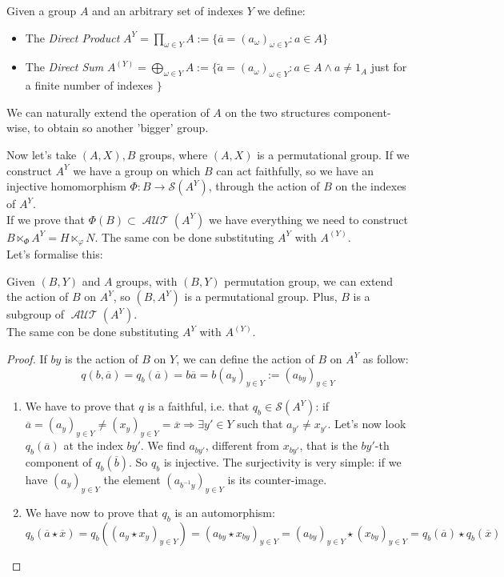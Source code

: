 \documentclass[mat1]{fmfdeloTS}
\DeclareMathOperator{\aut}{\mathcal{AUT}}
\begin{document}
\begin{definition}
Given a group $A$ and an arbitrary set of indexes $Y$ we define:
\begin{itemize}
\item 
\begin{description}
The \textit{Direct Product}
$A^Y = \prod_{\omega\in Y} A:=\{ \overline{a}=(a_\omega )_{\omega\in Y} : a\in A\}$
\end{description}
\item 
\begin{description}
The \textit{Direct Sum} 
$A^{(Y)} = \bigoplus_{\omega\in Y} A:=\{ \widetilde{a}=(a_\omega )_{\omega\in Y} : a\in A \wedge a\neq 1_A$ just for a finite number of indexes $\}$
\end{description}
\end{itemize}
We can naturally extend the operation of $A$ on the two structures component-wise, to obtain so another 'bigger' group.
\end{definition}


Now let's take $(A,X),B$ groups, where $(A,X)$ is a permutational group. If we construct $A^{Y}$ we have a group on which $B$ can act faithfully, so we have an injective homomorphism $\Phi : B\longrightarrow \mathcal{S}(A^Y)$, through the action of $B$ on the indexes of $A^Y$. \\
If we prove that $\Phi(B)\subset\aut(A^Y)$ we have everything we need to construct $B\ltimes_{\Phi} A^{Y}=H\ltimes_{\varphi} N$. The same con be done substituting $A^{Y}$ with $A^{(Y)}$.
\\
Let's formalise this:

\begin{proposition}
Given $(B,Y)$ and $A$ groups, with $(B,Y)$ permutation group, we can extend the action of $B$ on $A^Y$, so $(B,A^Y)$ is a permutational group. Plus, $B$ is a subgroup of $\aut(A^Y)$.\\
The same con be done substituting $A^{Y}$ with $A^{(Y)}$.
\end{proposition}
\begin{proof}
If $by$ is the action of $B$ on $Y$, we can define the action of $B$ on $A^Y$ as follow:
$$q(b,\overline{a})=q_b(\overline{a})=b\overline{a}=b(a_y)_{y\in Y}:=(a_{by})_{y\in Y}$$
\begin{enumerate}
\item We have to prove that $q$ is a faithful, i.e. that $q_b\in\mathcal{S}(A^Y)$:
if $\overline{a}=(a_y)_{y\in Y}\neq(x_y)_{y\in Y}=\overline{x} \Rightarrow \exists y'\in Y$ such that $a_{y'}\neq x_{y'}$. Let's now look $q_b(\overline{a})$ at the index $by'$. We find $a_{by'}$, different from $x_{by'}$, that is the $by'$-th component of $q_b(\overline{b})$. So $q_b$ is injective. The surjectivity is very simple: if we have $(a_y)_{y\in Y}$ the element $(a_{b^{-1}y})_{y\in Y}$ is its counter-image.
\item We have now to prove that $q_b$ is an automorphism: $q_b(\overline{a}\star\overline{x})=q_b((a_y\star x_y)_{y\in Y})=(a_{by}\star x_{by})_{y\in Y}=(a_{by})_{y\in Y}\star (x_{by})_{y\in Y}=q_b(\overline{a})\star q_b(\overline{x})$
\end{enumerate}
\end{proof}
\end{document}
